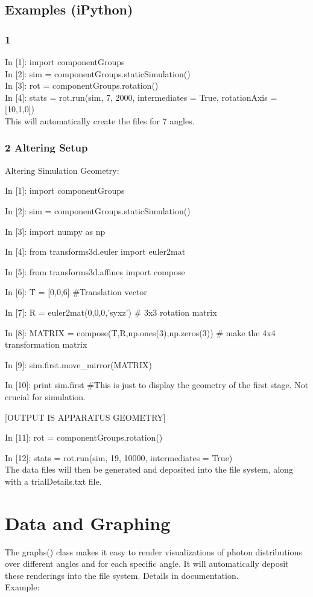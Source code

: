 \documentclass[11pt, oneside]{ltxdoc}   	%
\begin{document}
\subsection{Examples (iPython)}
\subsubsection{1}
In [1]: import componentGroups\\
In [2]: sim = componentGroups.staticSimulation()\\
In [3]: rot = componentGroups.rotation()\\
In [4]: stats = rot.run(sim, 7, 2000, intermediates = True, rotationAxis = [10,1,0])\\

This will automatically create the files for 7 angles.
\subsubsection{2 Altering Setup}

Altering Simulation Geometry:

In [1]: import componentGroups

In [2]: sim = componentGroups.staticSimulation()

In [3]: import numpy as np

In [4]: from transforms3d.euler import euler2mat

In [5]: from transforms3d.affines import compose

In [6]: T = [0,0,6] \#Translation vector

In [7]: R = euler2mat(0,0,0,'syxz') \# 3x3 rotation matrix 

In [8]: MATRIX = compose(T,R,np.ones(3),np.zeros(3)) \# make the 4x4 transformation matrix

In [9]: sim.first.move\_mirror(MATRIX)

In [10]: print sim.first    \#This is just to display the geometry of the first stage. Not crucial for simulation.

[OUTPUT IS APPARATUS GEOMETRY]

In [11]: rot = componentGroups.rotation()

In [12]: stats = rot.run(sim, 19, 10000, intermediates = True)\\

The data files will then be generated and deposited into the file system, along with a trialDetails.txt file.

\section{Data and Graphing}
The graphs() class makes it easy to render visualizations of photon distributions over different angles and for each specific angle. It will automatically deposit these renderings into the file system. Details in documentation.\\
Example:
\end{document}
